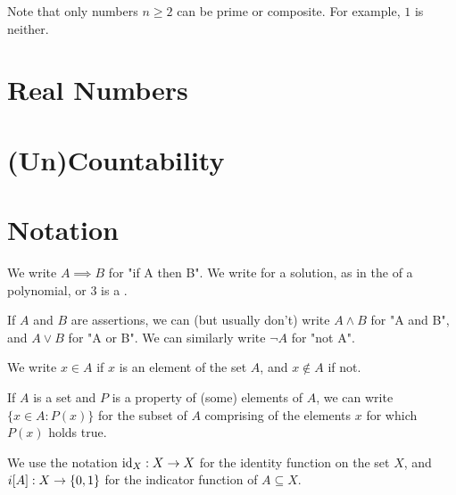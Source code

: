 \documentclass[12pt]{article}
\begin{document}
Note that only numbers $n \ge 2$ can be prime or composite.
For example, $1$ is neither.

\section{Real Numbers}
\section{(Un)Countability}

\appendix

\newpage
\section{Notation}

We write $A \implies B$ for "if A then B".
We write \sol{} for a solution, as in the \sol{} of a polynomial, or $3$ is a \sol{}.

If $A$ and $B$ are assertions,
we can (but usually don't) write $A \land B$ for "A and B",
and $A \lor B$ for "A or B".
We can similarly write $\neg A$ for "not A".

We write $x \in A$ if $x$ is an element of the set $A$, and $x \notin A$ if not.

If $A$ is a set and $P$ is a property of (some) elements of $A$,
we can write $\{x \in A : P(x)\}$ for the subset of $A$ comprising
of the elements $x$ for which $P(x)$ holds true.

We use the notation $\operatorname{id}_{X} : X \to X$ for the identity function on the set $X$,
and $i[A] : X \to \{0,1\}$ for the indicator function of $A \subseteq X$.
\end{document}
